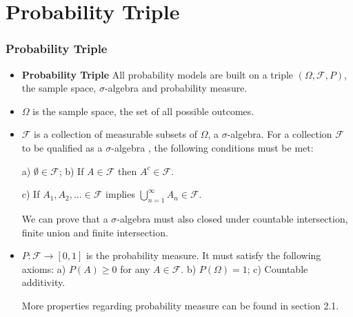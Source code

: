 \documentclass[handout]{beamer}
\begin{document}
\section{Probability Triple}
\frame
{
  \frametitle{Probability Triple}

   \begin{itemize}

      
       \item<1->\textbf{Probability Triple}  All probability models are built on a triple $(\Omega,\mathcal{F}, P)$, the sample space, $\sigma$-algebra and probability measure. 
       
       
             \item<2-> $\Omega$ is the sample space, the set of all possible outcomes. 
             \item<3-> $\mathcal{F}$ is a collection of measurable subsets of $\Omega$, a $\sigma$-algebra. For a collection $\mathcal{F}$ to be qualified as a  $\sigma$-algebra , the following conditions must be met: 
            
            a) $\emptyset \in \mathcal{F}$;    b) If $A \in \mathcal{F}$ then $A^c\in \mathcal{F}$.
            
            c) If $A_1, A_2,\ldots\in \mathcal{F}$ implies $\bigcup_{n=1}^{\infty} A_n \in \mathcal{F}$.
            
             We can prove that a $\sigma$-algebra must also closed under countable intersection, finite union and finite intersection. 
             
              \item<4-> $P: \mathcal{F} \to [0,1]$ is the probability measure. It must satisfy the following axioms: a)  $P(A)\geq 0$ for any $A\in \mathcal{F}$. b) $P(\Omega)=1$; c) Countable additivity. 
              
              More properties regarding probability measure can be found in section 2.1. 
                \end{itemize}
}
\end{document}
